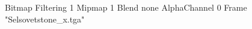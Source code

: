 {Bitmap
	{Filtering 1}
	{Mipmap 1}
	{Blend none}
	{AlphaChannel 0}
	{Frame "Selsovetstone_x.tga"}
}
